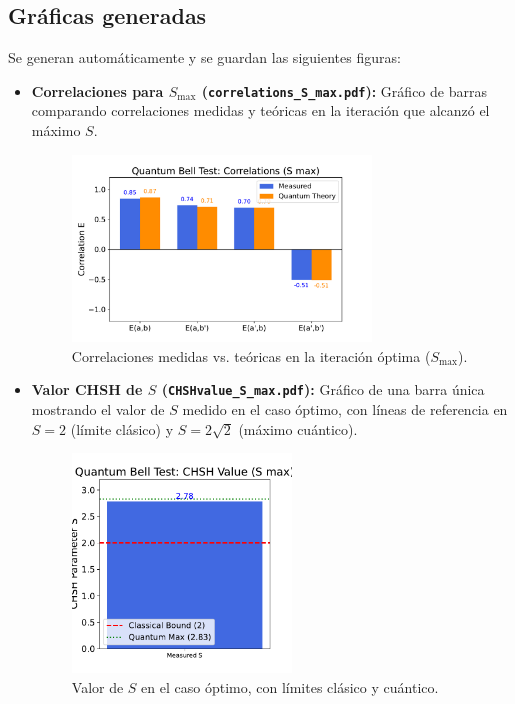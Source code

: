 \documentclass[11pt]{article}
\begin{document}
\subsection{Gráficas generadas}
Se generan automáticamente y se guardan las siguientes figuras:

\begin{itemize}
    \item \textbf{Correlaciones para $S_{\max}$ (\texttt{correlations\_S\_max.pdf}):}  
    Gráfico de barras comparando correlaciones medidas y teóricas en la iteración que alcanzó el máximo $S$.     
    \begin{figure}[H]
        \centering
        \includegraphics[width=0.75\textwidth]{Figures/correlations_S_max.pdf}
        \caption{Correlaciones medidas vs. teóricas en la iteración óptima ($S_{\max}$).}
    \end{figure}

    \item \textbf{Valor CHSH de $S$ (\texttt{CHSHvalue\_S\_max.pdf}):}  
    Gráfico de una barra única mostrando el valor de $S$ medido en el caso óptimo, con líneas de referencia en $S=2$ (límite clásico) y $S=2\sqrt{2}$ (máximo cuántico).
    
    \begin{figure}[H]
        \centering
        \includegraphics[width=0.55\textwidth]{Figures/CHSHvalue_S_max.pdf}
        \caption{Valor de $S$ en el caso óptimo, con límites clásico y cuántico.}
    \end{figure}


\end{itemize}
\end{document}
